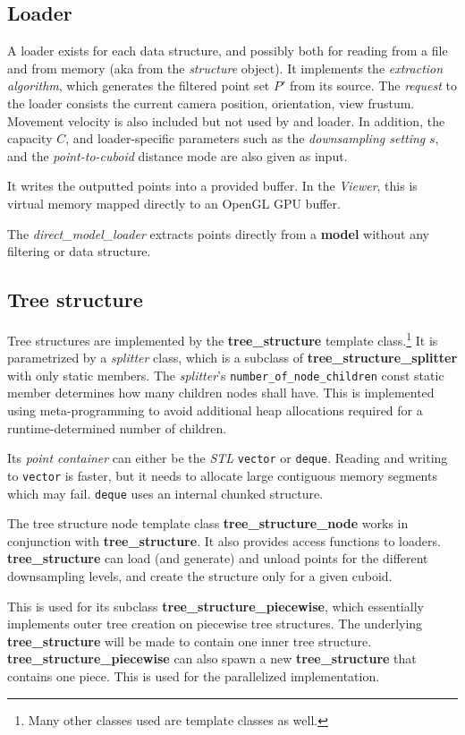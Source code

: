 \documentclass[a4paper,10pt,abstracton,notitlepage]{scrreprt}
\begin{document}
\subsection{Loader}
A loader exists for each data structure, and possibly both for reading from a file and from memory (aka from the \emph{structure} object). It implements the \emph{extraction algorithm}, which generates the filtered point set $P'$ from its source. The \emph{request} to the loader consists the current camera position, orientation, view frustum. Movement velocity is also included but not used by and loader. In addition, the capacity $C$, and loader-specific parameters such as the \emph{downsampling setting} $s$, and the \emph{point-to-cuboid} distance mode are also given as input.

It writes the outputted points into a provided buffer. In the \emph{Viewer}, this is virtual memory mapped directly to an OpenGL GPU buffer.

The \emph{direct\_model\_loader} extracts points directly from a \textbf{model} without any filtering or data structure.


\subsection{Tree structure}
Tree structures are implemented by the \textbf{tree\_structure} template class.\footnote{Many other classes used are template classes as well.} It is parametrized by a \emph{splitter} class, which is a subclass of \textbf{tree\_structure\_splitter} with only static members. The \emph{splitter}'s \texttt{number\_of\_node\_children} const static member determines how many children nodes shall have. This is implemented using meta-programming to avoid additional heap allocations required for a runtime-determined number of children.

Its \emph{point container} can either be the \emph{STL} \texttt{vector} or \texttt{deque}. Reading and writing to \texttt{vector} is faster, but it needs to allocate large contiguous memory segments which may fail. \texttt{deque} uses an internal chunked structure.

The tree structure node template class \textbf{tree\_structure\_node} works in conjunction with \textbf{tree\_structure}. It also provides access functions to loaders. \textbf{tree\_structure} can load (and generate) and unload points for the different downsampling levels, and create the structure only for a given cuboid.

This is used for its subclass \textbf{tree\_structure\_piecewise}, which essentially implements outer tree creation on piecewise tree structures. The underlying \textbf{tree\_structure} will be made to contain one inner tree structure. \textbf{tree\_structure\_piecewise} can also spawn a new \textbf{tree\_structure} that contains one piece. This is used for the parallelized implementation.
\end{document}
